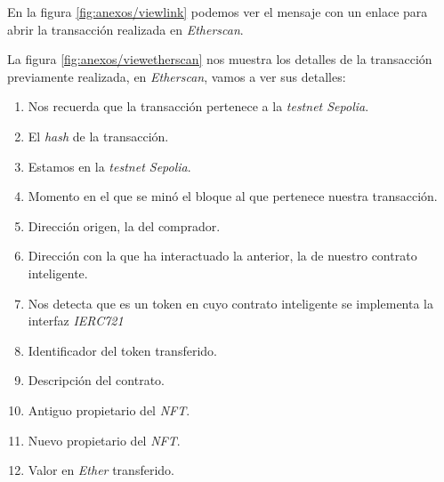 
En la figura \ref{fig:anexos/viewlink} podemos ver el mensaje con un enlace para abrir la transacción realizada en \textit{Etherscan}.


La figura \ref{fig:anexos/viewetherscan} nos muestra los detalles de la transacción previamente realizada, en \textit{Etherscan}, vamos a ver sus detalles:
\begin{enumerate}
    \item Nos recuerda que la transacción pertenece a la \textit{testnet Sepolia}.
    \item El \textit{hash} de la transacción.
    \item Estamos en la \textit{testnet Sepolia}.
    \item Momento en el que se minó el bloque al que pertenece nuestra transacción.
    \item Dirección origen, la del comprador.
    \item Dirección con la que ha interactuado la anterior, la de nuestro contrato inteligente.
    \item Nos detecta que es un token en cuyo contrato inteligente se implementa la interfaz \textit{IERC721}
    \item Identificador del token transferido.
    \item Descripción del contrato.
    \item Antiguo propietario del \textit{NFT}.
    \item Nuevo propietario del \textit{NFT}.
    \item Valor en \textit{Ether} transferido.
\end{enumerate}